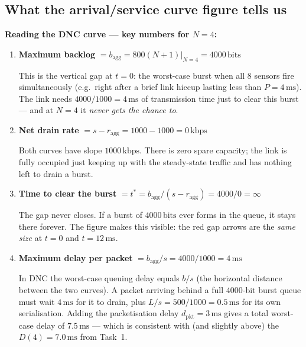 \documentclass[12pt, a4paper]{article}
\begin{document}
\subsection*{What the arrival/service curve figure tells us}

\begin{keybox}
  \textbf{Reading the DNC curve --- key numbers for $N = 4$:}

  \begin{enumerate}[leftmargin=1.6em, itemsep=6pt]

    \item \textbf{Maximum backlog} $= b_\text{agg} = 800(N+1)\big|_{N=4} = 4000\,\text{bits}$

      This is the vertical gap at $t = 0$: the worst-case burst when all 8
      sensors fire simultaneously (e.g.\ right after a brief link hiccup lasting
      less than $P = 4\,\text{ms}$).
      The link needs $4000/1000 = 4\,\text{ms}$ of transmission time just to
      clear this burst --- and at $N=4$ it \emph{never gets the chance to}.

    \item \textbf{Net drain rate} $= s - r_\text{agg} = 1000 - 1000 = 0\,\text{kbps}$

      Both curves have slope $1000\,\text{kbps}$.
      There is zero spare capacity; the link is fully occupied just keeping up
      with the steady-state traffic and has nothing left to drain a burst.

    \item \textbf{Time to clear the burst} $= t^* = b_\text{agg} / (s - r_\text{agg}) = 4000/0 = \infty$

      The gap never closes. If a burst of $4000\,\text{bits}$ ever forms in the
      queue, it stays there forever. The figure makes this visible: the red gap
      arrows are the \emph{same size} at $t=0$ and $t=12\,\text{ms}$.

    \item \textbf{Maximum delay per packet} $= b_\text{agg}/s = 4000/1000 = 4\,\text{ms}$

      In DNC the worst-case queuing delay equals $b/s$ (the horizontal distance
      between the two curves).
      A packet arriving behind a full $4000$-bit burst queue must wait
      $4\,\text{ms}$ for it to drain, plus $L/s = 500/1000 = 0.5\,\text{ms}$
      for its own serialisation. Adding the packetisation delay
      $d_\text{pkt} = 3\,\text{ms}$ gives a total worst-case delay of
      $7.5\,\text{ms}$ --- which is consistent with (and slightly above) the
      $D(4) = 7.0\,\text{ms}$ from Task~1.


\end{enumerate}
\end{keybox}
\end{document}
